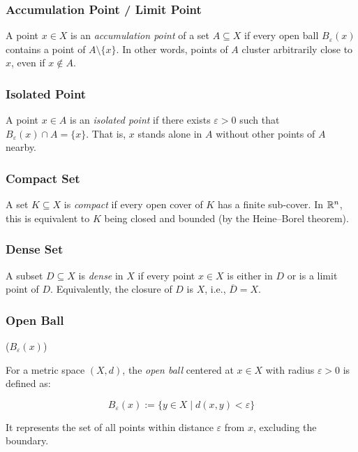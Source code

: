 \subsubsection{Accumulation Point / Limit Point}

A point \( x \in X \) is an \emph{accumulation point} of a set \( A \subseteq X \)
if every open ball \( B_\varepsilon(x) \) contains a point of \( A \setminus \{x\} \). 
In other words, points of \(A\) cluster arbitrarily close to 
\(x\), even if \( x \notin A \).

\subsubsection{Isolated Point} 
	      
A point \( x \in A \) is an \emph{isolated point} if there exists \( \varepsilon > 0 \)
such that \( B_\varepsilon(x) \cap A = \{x\} \). 
That is, \(x\) stands alone in \(A\) without other points of \(A\) nearby.

\subsubsection{Compact Set} 

A set \( K \subseteq X \) is \emph{compact} if every open cover of \( K \) has a finite sub-cover. 
In \(\mathbb{R}^n\), this is equivalent to \( K \) being closed and bounded (by the Heine–Borel theorem).

\subsubsection{Dense Set} 
	      
A subset \( D \subseteq X \) is \emph{dense} in \(X\) if every point 
\( x \in X \) is either in \( D \) or is a limit point of \( D \). 
Equivalently, the closure of \( D \) is \(X\), i.e., \( \overline{D} = X \).

\subsubsection{Open Ball} (\( B_\varepsilon(x) \)) 

For a metric space \( (X, d) \), the \emph{open ball} centered at 
\( x \in X \) with radius \( \varepsilon > 0 \) is defined as: 
	      
\[
	B_\varepsilon(x) := \{ y \in X \mid d(x, y) < \varepsilon \}
\]

It represents the set of all points within distance \( \varepsilon \) from \(x\), excluding the boundary.
